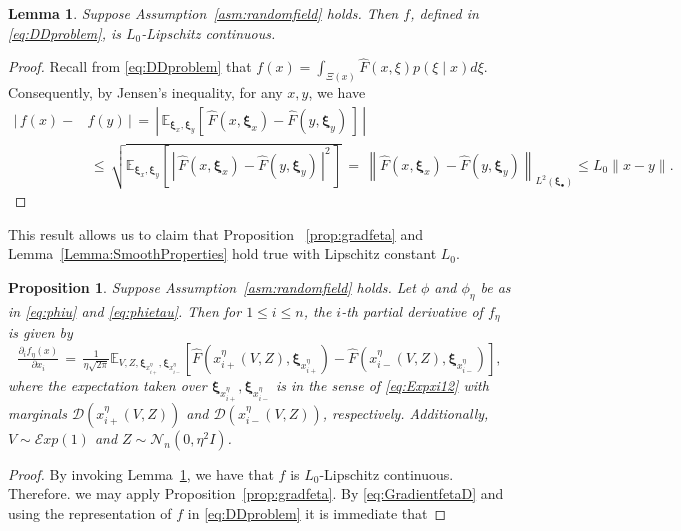 \documentclass[11pt,reqno]{amsart}
\newcommand{\1}{{\bf 1}}
\newcommand{\2}{{\bf 2}}
\newcommand{\pc}[1]{{\color{cyan}#1}}
\newcommand{\bxi}{\boldsymbol{\xi}}
\newcommand{\E}{\mathbb E}
\newcommand{\lnn}{\left\|}
\newcommand{\rnn}{\right\|}
\numberwithin{equation}{section}
\newtheorem{lemma}{Lemma}[section]
\newtheorem{proposition}{Proposition}[section]
\theoremstyle{remark}
\begin{document}
{				\begin{lemma}\label{lem:f-decdep2-Lip}
					Suppose Assumption~\ref{asm:randomfield} holds. Then $f$, defined in \eqref{eq:DDproblem}, is $L_0$-Lipschitz continuous. %
				\end{lemma}
				\begin{proof} 
				Recall from \eqref{eq:DDproblem} that $f(x)=\int_{\Xi(x)} \hat{F}(x, \xi)p(\xi \mid  x) d\xi$. Consequently, by Jensen's inequality, for any $x, y$, we have  
				\begin{align*}
					|\, f(x)-&f(y)\, |\, = \, \left|\, \mathbb{E}_{\bxi_x, \bxi_y}\left[\, \hat{F}(x,\bxi_x)-\hat{F}(y,\bxi_y)\, \right]\, \right|\\
					&\, \leq \, \sqrt{\E_{\bxi_x,\bxi_y}\left[\, \left| \,\hat{F}(x,\bxi_x)-\hat{F}(y,\bxi_y)\, \right|^2 \, \right]}\, =\, {\lnn \hat{F}(x, \bxi_x) - \hat{F}(y, \bxi_y) \rnn}_{L^2(\bxi_\bullet)} \leq L_0 \|x-y\|.
				\end{align*}
				\end{proof}
				This result allows us to claim that Proposition ~\ref{prop:gradfeta} and Lemma~\ref{Lemma:SmoothProperties} hold true with Lipschitz constant $L_0$. 
				\begin{proposition}\label{prop:DDgradfeta}
					Suppose Assumption~\ref{asm:randomfield} holds. Let $\phi$ and $\phi_\eta$ be as in \eqref{eq:phiu} and \eqref{eq:phietau}. %
					Then for $1 \leq i \leq n$, the $i$-th partial derivative of $f_\eta$ is given by 
					\begin{equation}\label{eq:DDGradientfetaD}
						\tfrac{\partial_i f_{\eta}(x)}{\partial x_i} \,  = \, \tfrac{1}{\eta\sqrt{2\pi}}\mathbb{E}_{{V,Z,\bxi_{x_{i+}^\eta},\bxi_{x_{i-}^\eta}}}\left[\hat{F}\left(x_{i+}^\eta(V,Z), \bxi_{x_{i+}^\eta}\right)-\hat{F}\left(x_{i-}^\eta(V,Z), \bxi_{x_{i-}^\eta}\right)\right],
					\end{equation}
					where the expectation taken over $\bxi_{x_{i+}^\eta},\bxi_{x_{i-}^\eta}$ is in the sense of \eqref{eq:Expxi12} with marginals $ \mathcal{D}(x_{i+}^\eta(V,Z))$ and $\mathcal{D}(x_{i-}^\eta(V,Z))$, respectively. Additionally, $V \sim \mathcal{E}xp(1)$ and $Z\sim \mathcal{N}_n(0,\eta^2 I)$.
				\end{proposition}
				\begin{proof}
				By invoking Lemma~\ref{lem:f-decdep2-Lip}, we have that $f$ is $L_0$-Lipschitz continuous. Therefore. we may apply Proposition~\ref{prop:gradfeta}. By \eqref{eq:GradientfetaD} and using the representation of $f$ in \eqref{eq:DDproblem} it is immediate that

\end{proof}}
\end{document}
